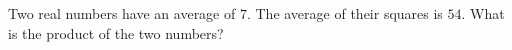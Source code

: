 Two real numbers have an average of $7$. The average of their squares is $54$. What is the product of the two numbers?
